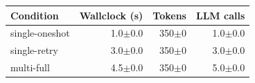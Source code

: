 \begin{tabular}{@{}lrrr@{}}
\toprule
Condition & Wallclock (s) & Tokens & LLM calls \\
\midrule
single-oneshot & 1.0$\pm$0.0 & 350$\pm$0 & 1.0$\pm$0.0 \\
single-retry & 3.0$\pm$0.0 & 350$\pm$0 & 3.0$\pm$0.0 \\
multi-full & 4.5$\pm$0.0 & 350$\pm$0 & 5.0$\pm$0.0 \\
\bottomrule
\end{tabular}
